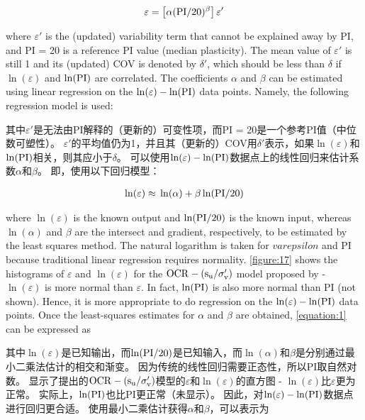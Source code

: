 \begin{align}
    \varepsilon=\left[\alpha(\rm{PI}/20)^\beta\right]\varepsilon'
    \label{equation:4}
\end{align}

\begin{paracol}{2}
     where $\varepsilon'$ is the (updated) variability term that cannot be explained away by PI, and PI = 20 is a reference PI value (median plasticity). The mean value of $\varepsilon'$ is still 1 and its (updated) COV is denoted by $\delta'$, which should be less than $\delta$ if $\ln(\varepsilon)$ and $\ln(\rm{PI})$ are correlated. The coefficients $\alpha$ and $\beta$ can be estimated using linear regression on the $\ln(\varepsilon)-\ln(\rm{PI})$ data points. Namely, the following regression model is used:

    \switchcolumn

    其中$\varepsilon'$是无法由PI解释的（更新的）可变性项，而PI = 20是一个参考PI值（中位数可塑性）。 $\varepsilon'$的平均值仍为1，并且其（更新的）COV用$\delta'$表示，如果$\ln(\varepsilon)$和$\ln(\rm{PI})$相关，则其应小于$\delta$。 可以使用$\ln(\varepsilon)-\ln(\rm{PI})$数据点上的线性回归来估计系数$\alpha$和$\beta$。 即，使用以下回归模型：

\end{paracol}

\begin{align}
    \ln(\varepsilon)\approx{}\ln(\alpha)+\beta\ln(\rm{PI}/20)
    \label{equation:5}
\end{align}

\begin{paracol}{2}
    where $\ln(\varepsilon)$ is the known output and $\ln(\rm{PI}/20)$ is the known input, whereas $\ln(\alpha)$ and $\beta$ are the intersect and gradient, respectively, to be estimated by the least squares method. The natural logarithm is taken for $varepsilon$ and PI because traditional linear regression requires normality. \autoref{figure:17} shows the histograms of $\varepsilon$ and $\ln(\varepsilon)$ for the $\rm{OCR}-(s_u/\sigma_v')$ model proposed by \citet{Jamiolkowski198557} - $\ln(\varepsilon)$ is more normal than $\varepsilon$. In fact, $\ln(\rm{PI})$ is also more normal than PI (not shown). Hence, it is more appropriate to do regression on the $\ln(\varepsilon)-\ln(\rm{PI})$ data points. Once the least-squares estimates for $\alpha$ and $\beta$ are obtained, \autoref{equation:1} can be expressed as

    \switchcolumn

    其中$\ln(\varepsilon)$是已知输出，而$\ln(\rm{PI}/20)$是已知输入，而$\ln(\alpha)$和$\beta$是分别通过最小二乘法估计的相交和渐变。 因为传统的线性回归需要正态性，所以PI取自然对数。 显示了\citet{Jamiolkowski198557}提出的$\rm{OCR}-(s_u/\sigma_v')$模型的$\varepsilon$和$\ln(\varepsilon)$的直方图 - $\ln(\varepsilon)$比$\varepsilon$更为正常。 实际上，$\ln(\rm{PI})$也比PI更正常（未显示）。 因此，对$\ln(\varepsilon)-\ln(\rm{PI})$数据点进行回归更合适。 使用最小二乘估计获得$\alpha$和$\beta$，可以表示为

    
\end{paracol}

